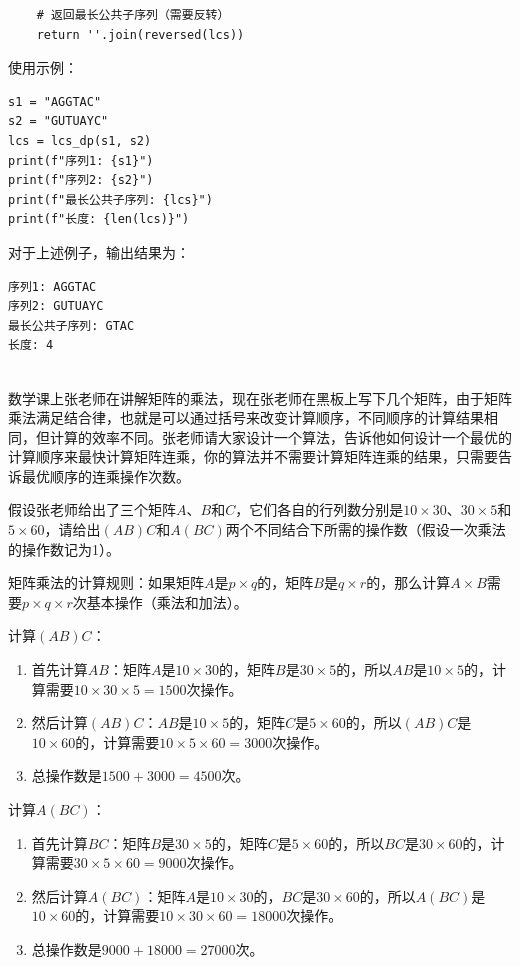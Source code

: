 \documentclass[12pt,twoside]{article}
\begin{document}
\begin{problems}
\begin{verbatim}
    # 返回最长公共子序列（需要反转）
    return ''.join(reversed(lcs))
\end{verbatim}

使用示例：

\begin{verbatim}
s1 = "AGGTAC"
s2 = "GUTUAYC"
lcs = lcs_dp(s1, s2)
print(f"序列1: {s1}")
print(f"序列2: {s2}")
print(f"最长公共子序列: {lcs}")
print(f"长度: {len(lcs)}")
\end{verbatim}

对于上述例子，输出结果为：

\begin{verbatim}
序列1: AGGTAC
序列2: GUTUAYC
最长公共子序列: GTAC
长度: 4
\end{verbatim}

\eparts

\\
数学课上张老师在讲解矩阵的乘法，现在张老师在黑板上写下几个矩阵，由于矩阵乘法满足结合律，也就是可以通过括号来改变计算顺序，不同顺序的计算结果相同，但计算的效率不同。张老师请大家设计一个算法，告诉他如何设计一个最优的计算顺序来最快计算矩阵连乘，你的算法并不需要计算矩阵连乘的结果，只需要告诉最优顺序的连乘操作次数。

\bparts
\ppart 假设张老师给出了三个矩阵$A$、$B$和$C$，它们各自的行列数分别是$10\times 30$、$30\times 5$和$5\times 60$，请给出$(AB)C$和$A(BC)$两个不同结合下所需的操作数（假设一次乘法的操作数记为1）。

矩阵乘法的计算规则：如果矩阵$A$是$p \times q$的，矩阵$B$是$q \times r$的，那么计算$A \times B$需要$p \times q \times r$次基本操作（乘法和加法）。

计算$(AB)C$：
\begin{enumerate}
    \item 首先计算$AB$：矩阵$A$是$10 \times 30$的，矩阵$B$是$30 \times 5$的，所以$AB$是$10 \times 5$的，计算需要$10 \times 30 \times 5 = 1500$次操作。
    \item 然后计算$(AB)C$：$AB$是$10 \times 5$的，矩阵$C$是$5 \times 60$的，所以$(AB)C$是$10 \times 60$的，计算需要$10 \times 5 \times 60 = 3000$次操作。
    \item 总操作数是$1500 + 3000 = 4500$次。
\end{enumerate}

计算$A(BC)$：
\begin{enumerate}
    \item 首先计算$BC$：矩阵$B$是$30 \times 5$的，矩阵$C$是$5 \times 60$的，所以$BC$是$30 \times 60$的，计算需要$30 \times 5 \times 60 = 9000$次操作。
    \item 然后计算$A(BC)$：矩阵$A$是$10 \times 30$的，$BC$是$30 \times 60$的，所以$A(BC)$是$10 \times 60$的，计算需要$10 \times 30 \times 60 = 18000$次操作。
    \item 总操作数是$9000 + 18000 = 27000$次。
\end{enumerate}


\end{problems}
\end{document}
